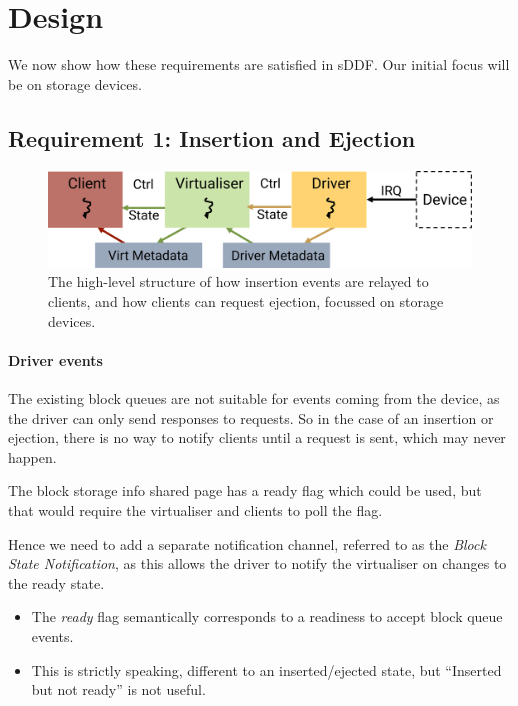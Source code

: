 \documentclass[a4paper,12pt]{report}
\newcommand{\figscale}{0.2}
\begin{document}
\section{Design}\label{s:hp-design}

We now show how these requirements are satisfied in sDDF. Our initial
focus will be on storage devices.

\subsection{Requirement 1: Insertion and Ejection}


\begin{figure}[th]
  \centering
  \includegraphics[scale=\figscale]{hotplug_insert_eject}
  \caption{The high-level structure of how insertion events are relayed to clients,
           and how clients can request ejection, focussed on storage devices.}
  \label{f:hotplug_insert_and_ejection}
\end{figure}

\paragraph{Driver events}

The existing block queues are not suitable for events coming from the device, as the driver can
only send responses to requests. So in the case of an insertion or
ejection, there is no way to notify clients until a request is sent,
which may never happen.

The block storage info shared page has a ready flag which could be
used, but that would require the virtualiser and clients to poll the flag.

Hence we need to add a separate notification channel, referred to as the
\emph{Block State Notification}, as this allows the driver to notify
the virtualiser on changes to the ready state.

\begin{itemize}
\item The \emph{ready} flag semantically corresponds to a readiness to
  accept block queue events.

\item This is strictly speaking, different to an inserted/ejected state,
  but ``Inserted but not ready'' is not useful.
\end{itemize}
\end{document}

